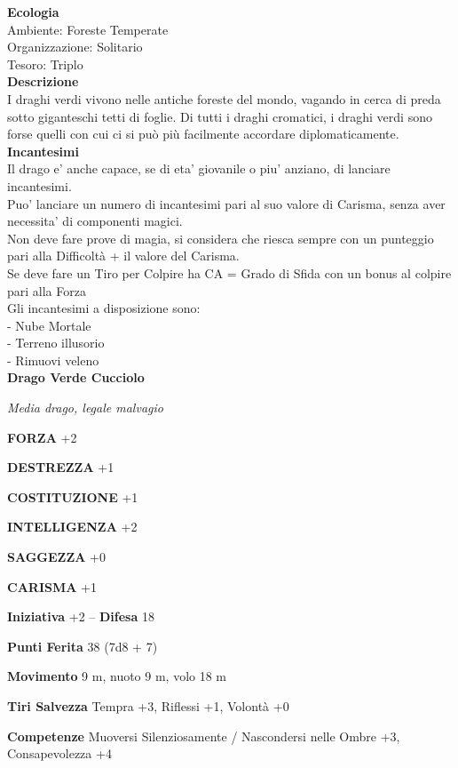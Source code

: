 \begin{multicols}{2}
\textbf{Ecologia}\\
Ambiente: Foreste Temperate\\
Organizzazione: Solitario\\
Tesoro: Triplo\\
\textbf{Descrizione}\\
I draghi verdi vivono nelle antiche foreste del mondo, vagando in cerca di preda sotto giganteschi tetti di foglie. Di tutti i draghi cromatici, i draghi verdi sono forse quelli con cui ci si può più facilmente accordare diplomaticamente.\\
\textbf{Incantesimi}\\
Il drago e' anche capace, se di eta' giovanile o piu' anziano, di lanciare incantesimi.\\
Puo' lanciare un numero di incantesimi pari al suo valore di Carisma, senza aver necessita' di componenti magici.\\
Non deve fare prove di magia, si considera che riesca sempre con un punteggio pari alla Difficoltà + il valore del Carisma.\\
Se deve fare un Tiro per Colpire ha CA = Grado di Sfida con un bonus al colpire pari alla Forza\\
Gli incantesimi a disposizione sono:\\
- Nube Mortale\\
- Terreno illusorio\\
- Rimuovi veleno\\

\medskip{}\textbf{Drago Verde Cucciolo}

\emph{Media drago, legale malvagio}

\textbf{FORZA} +2

\textbf{DESTREZZA} +1

\textbf{COSTITUZIONE} +1

\textbf{INTELLIGENZA} +2

\textbf{SAGGEZZA} +0

\textbf{CARISMA} +1

\textbf{Iniziativa} +2 -- \textbf{Difesa} 18

\textbf{Punti Ferita} 38 (7d8 + 7)

\textbf{Movimento} 9 m, nuoto 9 m, volo 18 m

\textbf{Tiri Salvezza} Tempra +3, Riflessi +1, Volontà +0

\textbf{Competenze} Muoversi Silenziosamente / Nascondersi nelle Ombre +3, Consapevolezza +4 


\end{multicols}
